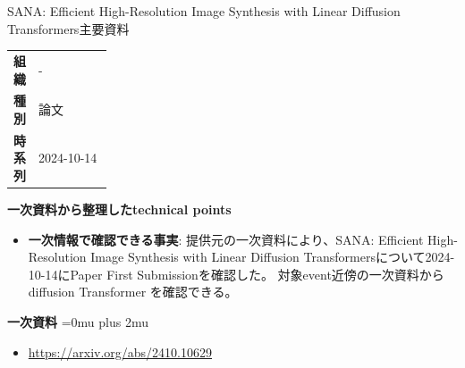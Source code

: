\begin{technicalnote}{SANA: Efficient High-Resolution Image Synthesis with Linear Diffusion Transformers}{主要資料}
\begingroup
\begin{tabularx}{\linewidth}{@{}>{\bfseries}p{0.22\linewidth}X@{}}
組織 & - \\
種別 & 論文 \\
時系列 & 2024-10-14 \\
\end{tabularx}
\smallskip
{\bfseries 一次資料から整理したtechnical points}
\begin{itemize}[leftmargin=1.5em,itemsep=0.35em]
\item \textbf{一次情報で確認できる事実}: 提供元の一次資料により、SANA: Efficient High-Resolution Image Synthesis with Linear Diffusion Transformersについて2024-10-14にPaper First Submissionを確認した。 対象event近傍の一次資料から diffusion Transformer を確認できる。
\end{itemize}
\begin{minipage}{\linewidth}
\begin{samepage}
{\bfseries 一次資料}
\begingroup\sloppy
\Urlmuskip=0mu plus 2mu\relax
\begin{itemize}[leftmargin=1.5em,itemsep=0.25em]
\item {\scriptsize\url{https://arxiv.org/abs/2410.10629}}
\end{itemize}
\endgroup
\end{samepage}
\end{minipage}
\endgroup
\end{technicalnote}
\medskip

